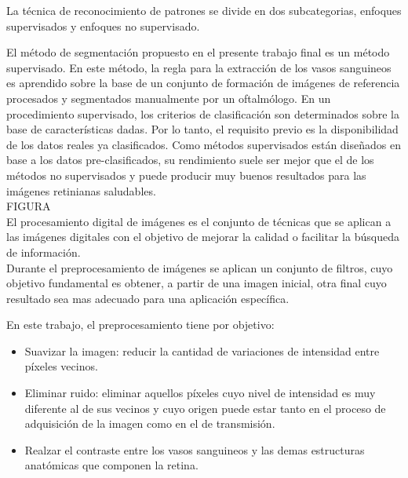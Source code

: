 La t\'ecnica de reconocimiento de patrones se divide en dos subcategorias, enfoques supervisados y enfoques no supervisado.

El m\'etodo de segmentaci\'on propuesto en el presente trabajo final es un m\'etodo supervisado. En este m\'etodo, la regla para la extracci\'on de los vasos sanguineos es aprendido sobre la base de un conjunto de formaci\'on de im\'agenes de referencia procesados y segmentados manualmente por un oftalm\'ologo. En un procedimiento supervisado, los criterios de clasificaci\'on son determinados sobre la base de caracter\'isticas dadas. Por lo tanto, el requisito previo es la disponibilidad de los datos reales ya clasificados. Como m\'etodos supervisados est\'an dise\~nados en base a los datos pre-clasificados, su rendimiento suele ser mejor que el de los m\'etodos no supervisados y puede producir muy buenos resultados para las im\'agenes retinianas saludables. \cite{fraz2012blood} \cite{akita1982computer} \cite{hoover2000locating} \\

FIGURA\\

El procesamiento digital de im\'agenes es el conjunto de t\'ecnicas que se aplican a las im\'agenes digitales con el objetivo de mejorar la calidad o facilitar la b\'usqueda de informaci\'on.\\

Durante el preprocesamiento de im\'agenes se aplican un conjunto de filtros, cuyo objetivo fundamental es obtener, a partir de una imagen inicial, otra final cuyo resultado sea mas adecuado para una aplicaci\'on espec\'ifica.

En este trabajo, el preprocesamiento tiene por objetivo:
\begin{itemize}
 \item Suavizar la imagen: reducir la cantidad de variaciones de intensidad entre p\'ixeles vecinos.
 \item Eliminar ruido: eliminar aquellos p\'ixeles cuyo nivel de intensidad es muy diferente al de sus vecinos y cuyo origen puede estar tanto en el proceso de adquisici\'on de la imagen como en el de transmisi\'on.
 \item Realzar el contraste entre los vasos sanguineos y las demas estructuras anat\'omicas que componen la retina.
\end{itemize}








